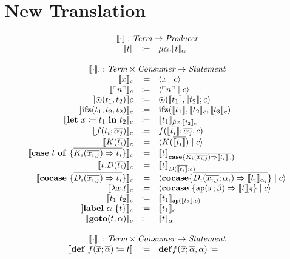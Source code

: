 \documentclass[nonacm]{acmart}
\newcommand{\translate}[1]{\ensuremath{\llbracket#1 \rrbracket}}
\newcommand{\lit}[1]{\ensuremath{\ulcorner #1\urcorner}}
\newcommand{\cut}[2]{\ensuremath{\langle #1 \mid #2 \rangle}}
\newcommand{\letin}[3]{\ensuremath{\mathbf{let}\ #1 \coloneqq #2\ \mathbf{in}\ #3}}
\newcommand{\caseof}[2]{\ensuremath{\mathbf{case}\ #1\ \mathbf{of}\ \{ #2 \}}}
\begin{document}
\section{New Translation}
\label{sec:new-translation}

\[
  \begin{array}{rcl}
    \multicolumn{3}{c}{\translate{\cdot} : \emph{Term} \rightarrow  \emph{Producer}}\\
    \translate{t} & \coloneqq & \mu \alpha. \translate{t}_{\alpha}\\
    \\
    \multicolumn{3}{c}{\translate{\cdot}_{\cdot} : \emph{Term}\times \emph{Consumer} \rightarrow \emph{Statement}}\\
    \translate{x}_{c} & \coloneq & \cut{x}{c} \\
    \translate{\lit{n}}_{c} & \coloneq & \cut{\lit{n}}{c} \\
    \translate{\odot(t_1,t_2)}{c} & \coloneq & \odot(\translate{t_1},\translate{t_2};c)\\
    \translate{\mathbf{ifz}(t_1,t_2,t_2)}_{c} & \coloneq & \mathbf{ifz}(\translate{t_1},\translate{t_2}_{c},\translate{t_3}_{c})\\
    \translate{\letin{x}{t_1}{t_2}}_{c} & \coloneq & \translate{t_1}_{\tilde{\mu}x.\translate{t_2}_c}\\
    \translate{f(\overline{t_i};\overline{\alpha_j})}_{c} & \coloneq & f(\overline{\translate{t_i}};\overline{\alpha_j},c)\\
    \translate{K(\overline{t_i})}_{c} & \coloneq & \cut{K(\overline{\translate{t_i}})}{c} \\
    \translate{\caseof{t}{\overline{K_i(\overline{x_{i,j}})\Rightarrow t_i}}}_{c} & \coloneq & \translate{t}_{\mathbf{case}\{ \overline{K_i(\overline{x_{i,j}})\Rightarrow \translate{t_i}_c}\}}\\
    \translate{t.D(\overline{t_i})}_{c} & \coloneq & \translate{t}_{D(\overline{\translate{t_i}};c)}\\
    \translate{\mathbf{cocase}\ \{\overline{D_i(\overline{x_{i,j}}) \Rightarrow t_i}\}}_{c} & \coloneq & \cut{\mathbf{cocase}\{\overline{D_i(\overline{x_{i,j}};\alpha_i)\Rightarrow \translate{t_i}_{\alpha_i}}\}}{c}\\
    \translate{\lambda x.t}_{c} & \coloneq & \cut{\mathbf{cocase}\ \{ \mathtt{ap}(x;\beta) \Rightarrow \translate{t}_{\beta} \}}{c} \\
    \translate{t_1\ t_2}_{c} & \coloneq & \translate{t_1}_{\mathtt{ap}(\translate{t_2};c)}\\
    \translate{\mathbf{label}\ \alpha\ \{t\}}_{c} & \coloneq & \translate{t_1}_{c}\\
    \translate{\mathbf{goto}(t;\alpha)}_{c} & \coloneq & \translate{t}_{\alpha} \\
    \\
    \multicolumn{3}{c}{\translate{\cdot}_{\cdot} : \emph{Term}\times \emph{Consumer} \rightarrow \emph{Statement}}\\
    \translate{\mathbf{def}\ f(\overline{x};\overline{\alpha}) \coloneq t} & \coloneq & \mathbf{def}f(\overline{x};\overline{\alpha},\alpha) \coloneq 
  \end{array}
\]
\end{document}

